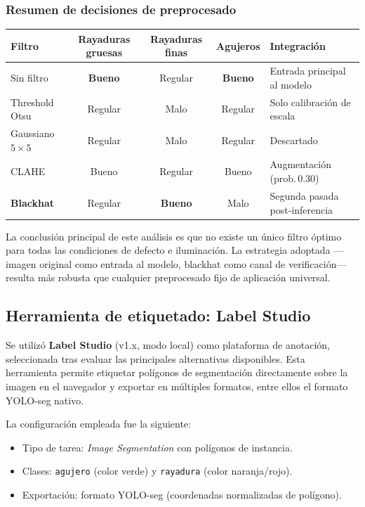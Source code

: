 \documentclass[12pt,a4paper]{article}
\begin{document}
\subsubsection{Resumen de decisiones de preprocesado}

\begin{center}
\begin{tabular}{lcccl}
  \toprule
  \textbf{Filtro} & \textbf{Rayaduras gruesas} & \textbf{Rayaduras finas} & \textbf{Agujeros} & \textbf{Integración} \\
  \midrule
  Sin filtro           & \textbf{Bueno} & Regular  & \textbf{Bueno} & Entrada principal al modelo \\
  Threshold Otsu       & Regular  & Malo     & Regular  & Solo calibración de escala \\
  Gaussiano $5\times5$ & Regular  & Malo     & Regular  & Descartado \\
  CLAHE                & Bueno    & Regular  & Bueno    & Augmentación (prob.\,0.30) \\
  \textbf{Blackhat}    & Regular  & \textbf{Bueno} & Malo & Segunda pasada post-inferencia \\
  \bottomrule
\end{tabular}
\end{center}

La conclusión principal de este análisis es que no existe un único filtro óptimo para
todas las condiciones de defecto e iluminación. La estrategia adoptada —imagen original
como entrada al modelo, blackhat como canal de verificación— resulta más robusta que
cualquier preprocesado fijo de aplicación universal.

\subsection{Herramienta de etiquetado: Label Studio}

Se utilizó \textbf{Label Studio} (v1.x, modo local) como plataforma de anotación,
seleccionada tras evaluar las principales alternativas disponibles. Esta herramienta
permite etiquetar polígonos de segmentación directamente sobre la imagen en el
navegador y exportar en múltiples formatos, entre ellos el formato YOLO-seg nativo.

La configuración empleada fue la siguiente:
\begin{itemize}
  \item Tipo de tarea: \emph{Image Segmentation} con polígonos de instancia.
  \item Clases: \texttt{agujero} (color verde) y \texttt{rayadura} (color naranja/rojo).
  \item Exportación: formato YOLO-seg (coordenadas normalizadas de polígono).
\end{itemize}
\end{document}
